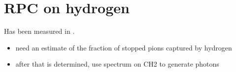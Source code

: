 \section{RPC on hydrogen}

Has been measured in \cite{RPC_1972_Bistirlich_PhysRevC.5.1867}.

{\red
  \begin{itemize}
  \item 
    need an estimate of the fraction of stopped pions captured by hydrogen
  \item
    after that is determined, use spectrum on CH2 to generate photons
  \end{itemize}
}
